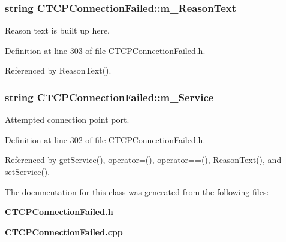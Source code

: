 \subsubsection{\setlength{\rightskip}{0pt plus 5cm}string CTCPConnection\-Failed::m\_\-Reason\-Text\hspace{0.3cm}{\tt  [private]}}\label{classCTCPConnectionFailed_o2}


Reason text is built up here.



Definition at line 303 of file CTCPConnection\-Failed.h.

Referenced by Reason\-Text().
\subsubsection{\setlength{\rightskip}{0pt plus 5cm}string CTCPConnection\-Failed::m\_\-Service\hspace{0.3cm}{\tt  [private]}}\label{classCTCPConnectionFailed_o1}


Attempted connection point port.



Definition at line 302 of file CTCPConnection\-Failed.h.

Referenced by get\-Service(), operator=(), operator==(), Reason\-Text(), and set\-Service().

The documentation for this class was generated from the following files:\begin{CompactItemize}
\item 
{\bf CTCPConnection\-Failed.h}\item 
{\bf CTCPConnection\-Failed.cpp}\end{CompactItemize}
